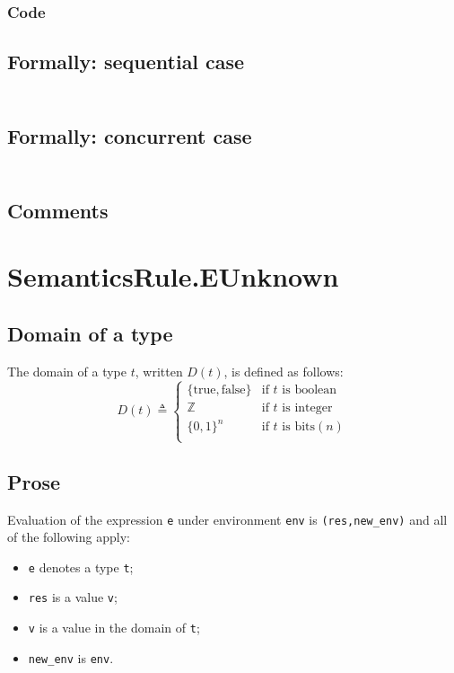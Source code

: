 \documentclass{book}
\begin{document}
  \subsubsection{Code}

  \subsection{Formally: sequential case}
  \begin{align}
  \end{align} 

  \subsection{Formally: concurrent case}
  \begin{align}
  \end{align} 

  \subsection{Comments}

\section{SemanticsRule.EUnknown \label{sec:SemanticsRule.EUnknown}}

  \subsection{Domain of a type}

  The domain of a type $t$, written $D(t)$, is defined as follows:
  \[
  D(t) \triangleq \left\{
    \begin{array}{ll}
      \{\text{true}, \text{false} \} & \text{if } t \text{ is boolean}  \\
      \mathbb{Z}                     & \text{if } t \text{ is integer}  \\
      {\{0, 1\}}^n                   & \text{if } t \text{ is bits} (n) \\
    \end{array}
  \right.
  \]

  \subsection{Prose}
  Evaluation of the expression \texttt{e} under environment \texttt{env} is
  \texttt{(res,new\_env)} and all of the following apply:
  \begin{itemize}
  \item \texttt{e} denotes a type \texttt{t};
  \item \texttt{res} is a value \texttt{v};
  \item \texttt{v} is a value in the domain of \texttt{t};
  \item \texttt{new\_env} is \texttt{env}.
  \end{itemize}
\end{document}
